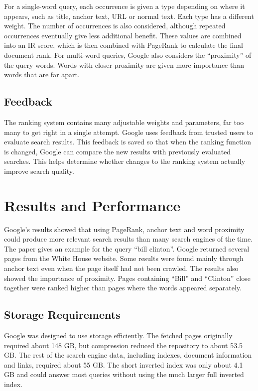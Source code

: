\documentclass[10pt,a4paper]{article}
\begin{document}
For a single-word query, each occurrence is given a type depending on where it appears, such as title, anchor text, URL or normal text. Each type has a different weight. The number of occurrences is also considered, although repeated occurrences eventually give less additional benefit. These values are combined into an IR score, which is then combined with PageRank to calculate the final document rank. For multi-word queries, Google also considers the ``proximity'' of the query words. Words with closer proximity are given more importance than words that are far apart.

\subsection{Feedback}

The ranking system contains many adjustable weights and parameters, far too many to get right in a single attempt. Google uses feedback from trusted users to evaluate search results. This feedback is saved so that when the ranking function is changed, Google can compare the new results with previously evaluated searches. This helps determine whether changes to the ranking system actually improve search quality.

\section{Results and Performance}

Google's results showed that using PageRank, anchor text and word proximity could produce more relevant search results than many search engines of the time. The paper gives an example for the query ``bill clinton''. Google returned several pages from the White House website. Some results were found mainly through anchor text even when the page itself had not been crawled. The results also showed the importance of proximity. Pages containing ``Bill'' and ``Clinton'' close together were ranked higher than pages where the words appeared separately.

\subsection{Storage Requirements}

Google was designed to use storage efficiently. The fetched pages originally required about 148 GB, but compression reduced the repository to about 53.5 GB. The rest of the search engine data, including indexes, document information and links, required about 55 GB. The short inverted index was only about 4.1 GB and could answer most queries without using the much larger full inverted index.
\end{document}
